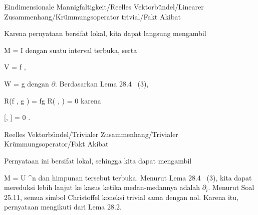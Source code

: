 {Eindimensionale Mannigfaltigkeit/Reelles Vektorbündel/Linearer Zusammenhang/Krümmungsoperator trivial/Fakt}
{Akibat}
{}
{

\faktzusatz {}
\faktzusatz {}

}
{

Karena pernyataan bersifat lokal, kita dapat langsung mengambil

\mavergleichskette
{\vergleichskette
{ M
}
{ = }{ I
}
{  }{
}
{    }{
}
{   }{
}
}
{}{}{}
dengan suatu interval terbuka, serta

\mavergleichskette
{\vergleichskette
{ V
}
{ = }{ f \partial
}
{  }{
}
{    }{
}
{   }{
}
}
{}{}{,}

\mavergleichskette
{\vergleichskette
{ W
}
{ = }{ g \partial
}
{  }{
}
{    }{
}
{   }{
}
}
{}{}{}
dengan
$\partial$. Berdasarkan
Lema 28.4  (3),

\mavergleichskettedisp
{\vergleichskette
{ R(f \partial, g \partial)
}
{ =} { fg R( \partial, \partial)
}
{ =} { 0
}
{ } {
}
{ } {
}
}
{}{}{}
karena

\mavergleichskette
{\vergleichskette
{ [\partial, \partial ]
}
{ = }{ 0
}
{  }{
}
{    }{
}
{   }{
}
}
{}{}{.}

}



{Reelles Vektorbündel/Trivialer Zusammenhang/Trivialer Krümmungsoperator/Fakt}
{Akibat}
{}
{

\faktzusatz {}
\faktzusatz {}

}
{

Pernyataan ini bersifat lokal, sehingga kita dapat mengambil

\mavergleichskette
{\vergleichskette
{ M
}
{ = }{ U
}
{ \subseteq }{ \R^n
}
{    }{
}
{   }{
}
}
{}{}{}
dan himpunan tersebut terbuka. Menurut
Lema 28.4  (3),
kita dapat mereduksi lebih lanjut ke kasus ketika medan-medannya adalah
$\partial_i$. Menurut
Soal 25.11,
semua simbol Christoffel koneksi trivial sama dengan nol. Karena itu, pernyataan mengikuti dari
Lema 28.2.

}

